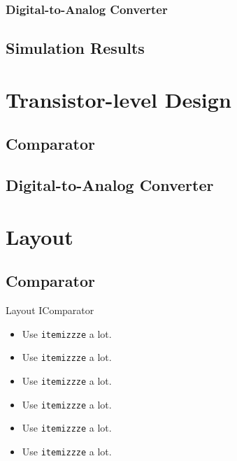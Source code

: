 \documentclass{beamer}
\begin{document}
 \subsubsection{Digital-to-Analog Converter}
 \subsection{Simulation Results}
 \section{Transistor-level Design}
 \subsection{Comparator}
 \subsection{Digital-to-Analog Converter}
 \section{Layout}
 \subsection{Comparator}
 \begin{frame}{Layout I}{Comparator}
  \begin{itemize}
   \item Use \texttt{itemizzze} a lot.
   \item Use \texttt{itemizzze} a lot.
   \item Use \texttt{itemizzze} a lot.
   \item Use \texttt{itemizzze} a lot.
   \item Use \texttt{itemizzze} a lot.
   \item Use \texttt{itemizzze} a lot.
  \end{itemize}
 \end{frame}
 
\end{document}
